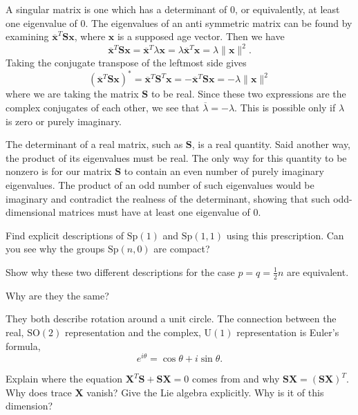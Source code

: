 \documentclass[../the-road-to-reality.tex]{subfiles}
\begin{document}
\begin{questions}
\begin{solution}
	A singular matrix is one which has a determinant of $0$, or equivalently, at least one eigenvalue of $0$. The eigenvalues of an anti symmetric matrix can be found by examining $\overline{\mathbf{x}}^T\mathbf{S}\mathbf{x}$, where $\mathbf{x}$ is a supposed age vector. Then we have
	\[
		\overline{\mathbf{x}}^T\mathbf{Sx} = \overline{\mathbf{x}}^T\lambda\mathbf{x} = \lambda\overline{\mathbf{x}}^T\mathbf{x} = \lambda\|\mathbf{x}\|^2.
	\] 
	Taking the conjugate transpose of the leftmost side gives  
	\[
		(\overline{\mathbf{x}}^T\mathbf{Sx})^* = \overline{\mathbf{x}}^T\mathbf{S}^T\mathbf{x} = -\overline{\mathbf{x}}^T\mathbf{Sx} = -\lambda\|\mathbf{x}\|^2
	\] 
	where we are taking the matrix $\mathbf{S}$ to be real. Since these two expressions are the complex conjugates of each other, we see that $\overline{\lambda} = -\lambda$. This is possible only if $\lambda$ is zero or purely imaginary.

	The determinant of a real matrix, such as $\mathbf{S}$, is a real quantity. Said another way,  the product of its eigenvalues must be real. The only way for this quantity to be nonzero is for our matrix $\mathbf{S}$ to contain an even number of purely imaginary eigenvalues. The product of an odd number of such eigenvalues would be imaginary and contradict the realness of the determinant, showing that such odd-dimensional matrices must have at least one eigenvalue of $0$.
\end{solution}

\question Find explicit descriptions of $\mathrm{Sp}(1)$ and $\mathrm{Sp}(1, 1)$ using this prescription. Can you see why the groups $\mathrm{Sp}(n, 0)$ are compact?

\question Show why these two different descriptions for the case $p = q = \frac{1}{2}n$ are equivalent.

\question Why are they the same?

\begin{solution}
	They both describe rotation around a unit circle. The connection between the real, $\mathrm{SO}(2)$ representation and the complex, $\mathrm{U}(1)$ representation is Euler's formula,
	\[
	e^{i\theta} = \cos\theta + i\sin\theta.
	\] 
\end{solution}

\question Explain where the equation $\mathbf{X}^T\mathbf{S} + \mathbf{SX} = 0$ comes from and why $\mathbf{SX} = (\mathbf{SX})^T$. Why does trace $\mathbf{X}$ vanish? Give the Lie algebra explicitly. Why is it of this dimension?


\end{questions}
\end{document}
